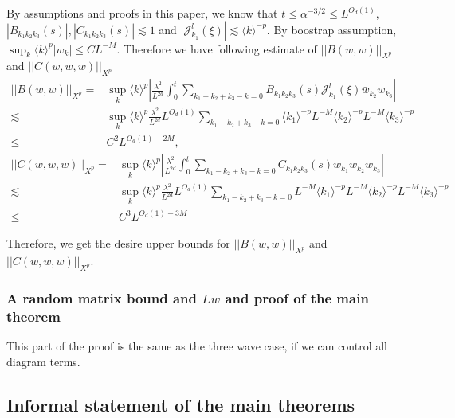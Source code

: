 By assumptions and proofs in this paper, we know that $t\le \alpha^{-3/2}\le L^{O_d(1)}$,  $|B_{k_1k_2k_3}(s)|, |C_{k_1k_2k_3}(s)|\lesssim 1$ and $|\mathcal{J}^{l}_{k_1}(\xi)|\lesssim \langle k\rangle^{-p}$. By boostrap assumption, $\sup_{k} \langle k\rangle^{p} |w_k|\le CL^{-M}$. Therefore we have following estimate of $||B(w,w)||_{X^p}$ and $||C(w,w,w)||_{X^p}$
\begin{equation}
\begin{split}
    ||B(w,w)||_{X^p}=&\sup_{k} \langle k\rangle^{p} \left|\frac{\lambda^2}{L^{2d}} \int^{t}_0\sum_{k_1-k_2+k_3-k=0} B_{k_1k_2k_3}(s)  \mathcal{J}^{l}_{k_1}(\xi)\bar{w}_{k_2}w_{k_3}\right|    
    \\
    \lesssim& \sup_{k} \langle k\rangle^{p} \frac{\lambda^2}{L^{2d}} L^{O_d(1)} \sum_{k_1-k_2+k_3-k=0} \langle k_1\rangle^{-p} L^{-M}\langle k_2\rangle^{-p} L^{-M}\langle k_3\rangle^{-p}
    \\
    \le& C^2 L^{O_d(1)-2M},
\end{split}
\end{equation}
\begin{equation}
\begin{split}
    ||C(w,w,w)||_{X^p}=&\sup_{k} \langle k\rangle^{p} \left|\frac{\lambda^2}{L^{2d}} \int^{t}_0\sum_{k_1-k_2+k_3-k=0} C_{k_1k_2k_3}(s)  w_{k_1}\bar{w}_{k_2}w_{k_3}\right|
    \\
    \lesssim& \sup_{k} \langle k\rangle^{p} \frac{\lambda^2}{L^{2d}} L^{O_d(1)} \sum_{k_1-k_2+k_3-k=0} L^{-M}\langle k_1\rangle^{-p} L^{-M}\langle k_2\rangle^{-p} L^{-M}\langle k_3\rangle^{-p}
    \\
    \le& C^3 L^{O_d(1)-3M}
\end{split}
\end{equation}

Therefore, we get the desire upper bounds for $||B(w,w)||_{X^p}$ and $||C(w,w,w)||_{X^p}$.

\subsubsection{A random matrix bound and $Lw$ and proof of the main theorem}\label{sec.randmatintro} This part of the proof is the same as the three wave case, if we can control all diagram terms.






\subsection{Informal statement of the main theorems}

